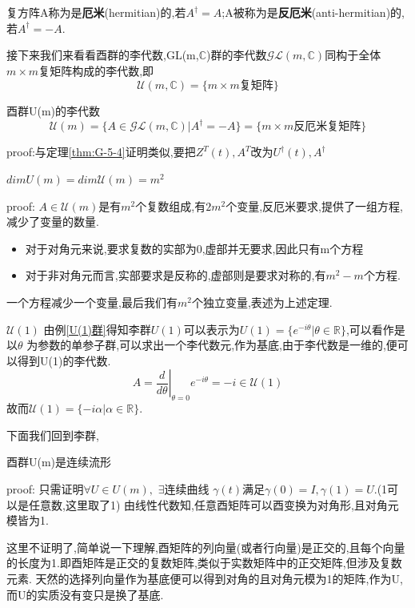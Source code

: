 \documentclass[../main.tex]{subfiles}
\begin{document}
\begin{definition}
    复方阵A称为是\textbf{厄米}(hermitian)的,若$A^\dagger = A$;A被称为是\textbf{反厄米}(anti-hermitian)的,若$A^\dagger = -A$.
\end{definition}
接下来我们来看看酉群的李代数,GL(m,$\mathbb{C}$)群的李代数$\mathscr{GL}(m,\mathbb{C})$同构于全体$m\times m$复矩阵构成的李代数,即
$$\mathscr{U}(m,\mathbb{C}) = \{m\times m \text{复矩阵}\}$$
\begin{theorem}
    酉群U(m)的李代数
    $$\mathscr{U}(m) = \{A \in \mathscr{GL}(m,\mathbb{C})|A^\dagger = -A\} = \{m\times m \text{反厄米复矩阵}\}$$
\end{theorem}
proof:与定理\ref{thm:G-5-4}证明类似,要把$Z^T(t),A^T$改为$U^\dagger(t),A^\dagger$
\begin{theorem}{}{}
   \centering $dimU(m)=dim\mathscr{U}(m)=m^2$
\end{theorem}
proof: $A\in \mathscr{U}(m)$是有$m^2$个复数组成,有$2m^2$个变量,反厄米要求,提供了一组方程,减少了变量的数量.
\begin{itemize}
    \item 对于对角元来说,要求复数的实部为0,虚部并无要求,因此只有m个方程
    \item 对于非对角元而言,实部要求是反称的,虚部则是要求对称的,有$m^2 - m$个方程.
\end{itemize}
一个方程减少一个变量,最后我们有$m^2$个独立变量,表述为上述定理.
\begin{example}{$\mathscr{U}(1)$}{}
   由例\ref{U(1)群}得知李群$U(1)$可以表示为$U(1) = \{e^{-i\theta}|\theta \in \mathbb{R}\}$,可以看作是以$\theta$
   为参数的单参子群,可以求出一个李代数元,作为基底,由于李代数是一维的,便可以得到U(1)的李代数.
   $$A = \left.\frac{d}{d\theta}\right|_{\theta = 0} e^{-i \theta} = -i \in \mathscr{U}(1)$$
   故而$\mathscr{U}(1) = \{-i\alpha|\alpha \in \mathbb{R}\}$.
\end{example}
下面我们回到李群,
\begin{theorem}
    酉群U(m)是连续流形
\end{theorem}
proof: 只需证明$\forall U \in U(m),$ $\exists$连续曲线 $\gamma(t)$满足$\gamma(0) = I,\gamma(1) = U$.(1可以是任意数,这里取了1)
由线性代数知,任意酉矩阵可以酉变换为对角形,且对角元模皆为1.
\begin{note}
这里不证明了,简单说一下理解,酉矩阵的列向量(或者行向量)是正交的,且每个向量的长度为1.即酉矩阵是正交的复数矩阵,类似于实数矩阵中的正交矩阵,但涉及复数元素.
天然的选择列向量作为基底便可以得到对角的且对角元模为1的矩阵,作为U,而U的实质没有变只是换了基底.
\end{note}
\end{document}
